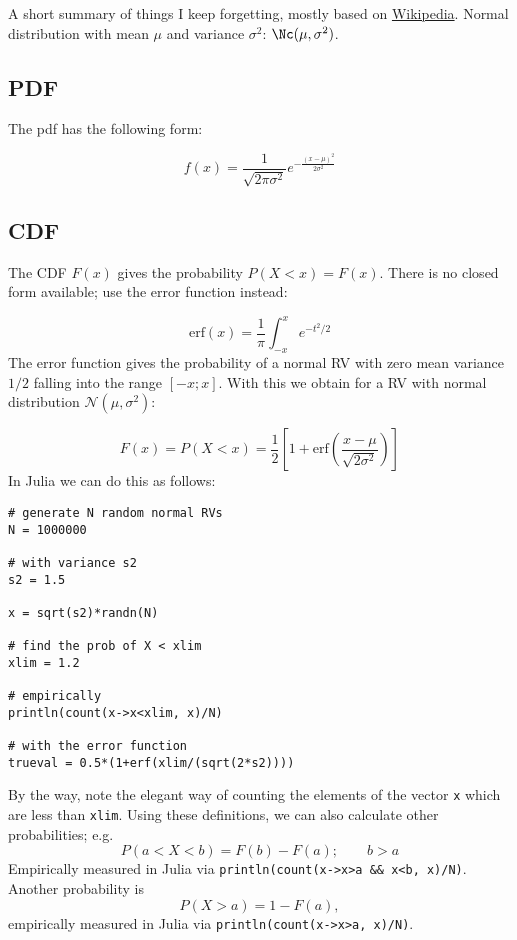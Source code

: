 
A short summary of things I keep forgetting, mostly based on \href{https://en.wikipedia.org/wiki/Normal_distribution}{Wikipedia}.
%
Normal distribution with mean $\mu$ and variance $\sigma^2$: $\Nc(\mu, \sigma^2)$.

\subsection{PDF}\label{pdf}

The pdf has the following form:

\[f(x) = \frac{1}{\sqrt{2\pi\sigma^2}} e^{ - \frac{(x-\mu)^2}{2\sigma^2} }\]

\subsection{CDF}\label{cdf}

The CDF $F(x)$ gives the probability $P(X < x ) = F(x)$. There is no closed form available; use the error function instead:

\[\text{erf}(x) = \frac{1}{\pi} \int_{-x}^x e^{-t^2/2}\]
%
The error function gives the probability of a normal RV with zero mean variance $1/2$ falling into the range $[-x;x]$.
%
With this we obtain for a RV with normal distribution $\mathcal{N }(\mu, \sigma^2)$:

\[F(x) = P(X < x)  = \frac{1}{2} \left[ 1 + \text{erf} \left( \frac{x-\mu}{\sqrt{2\sigma^2}} \right) \right] \]
%
In Julia we can do this as follows:

\begin{verbatim}
# generate N random normal RVs
N = 1000000

# with variance s2
s2 = 1.5

x = sqrt(s2)*randn(N)

# find the prob of X < xlim
xlim = 1.2

# empirically
println(count(x->x<xlim, x)/N)

# with the error function
trueval = 0.5*(1+erf(xlim/(sqrt(2*s2))))
\end{verbatim}
%
By the way, note the elegant way of counting the elements of the vector \texttt{x} which are less than \texttt{xlim}. Using these definitions, we can also calculate other probabilities; e.g.
%
\[P(a < X < b) = F(b) - F(a); \qquad b > a\]
%
Empirically measured in Julia via \texttt{println(count(x-\textgreater{}x\textgreater{}a\ \&\&\ x\textless{}b,\ x)/N)}. Another probability is
%
\[P(X > a) = 1 - F(a),\]
%
empirically measured in Julia via \texttt{println(count(x-\textgreater{}x\textgreater{}a,\ x)/N)}.
